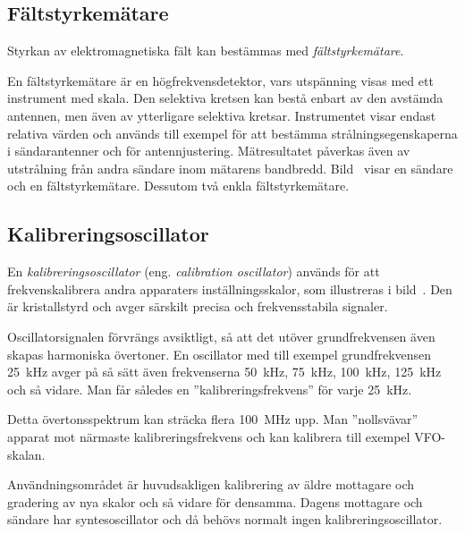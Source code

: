 \subsection{Fältstyrkemätare}
\label{fältstyrkemätare}


Styrkan av elektromagnetiska fält kan bestämmas med \emph{fältstyrkemätare}.

En fältstyrkemätare är en högfrekvensdetektor, vars utspänning visas med ett
instrument med skala.
Den selektiva kretsen kan bestå enbart av den avstämda antennen, men även av
ytterligare selektiva kretsar.
Instrumentet visar endast relativa värden och används till exempel för att
bestämma strålningsegenskaperna i sändarantenner och för antennjustering.
Mätresultatet påverkas även av utstrålning från andra sändare inom mätarens
bandbredd.
Bild~ visar en sändare och en fältstyrkemätare.
Dessutom två enkla fältstyrkemätare.

\newpage
\subsection{Kalibreringsoscillator}


En \emph{kalibreringsoscillator} (eng. \emph{calibration oscillator}) används
för att frekvenskalibrera andra apparaters inställningsskalor, som illustreras
i bild~.
Den är kristallstyrd och avger särskilt precisa och frekvensstabila signaler.

Oscillatorsignalen förvrängs avsiktligt, så att det utöver grundfrekvensen även
skapas harmoniska övertoner.
En oscillator med till exempel grundfrekvensen \qty{25}{\kilo\hertz} avger på så
sätt även frekvenserna \qty{50}{\kilo\hertz}, \qty{75}{\kilo\hertz},
\qty{100}{\kilo\hertz}, \qty{125}{\kilo\hertz} och så vidare.
Man får således en ''kalibreringsfrekvens'' för varje \qty{25}{\kilo\hertz}.

Detta övertonsspektrum kan sträcka flera \qty{100}{\mega\hertz} upp.
Man ''nollsvävar'' apparat mot närmaste kalibreringsfrekvens och kan kalibrera
till exempel VFO-skalan.

Användningsområdet är huvudsakligen kalibrering av äldre mottagare och gradering
av nya skalor och så vidare för densamma.
Dagens mottagare och sändare har syntesoscillator och då behövs normalt ingen
kalibreringsoscillator.

